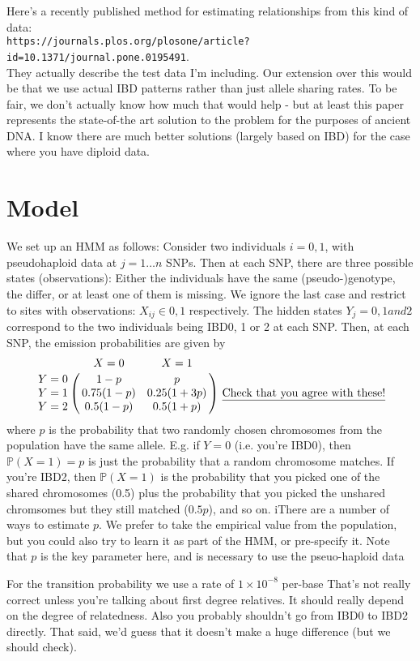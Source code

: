 \documentclass[10pt,a4]{article}
\begin{document}
Here's a recently published method for estimating relationships from this kind of data:\\ \texttt{https://journals.plos.org/plosone/article?id=10.1371/journal.pone.0195491}. \\ They actually describe the test data I'm including. Our extension over this would be that we use actual IBD patterns rather than just allele sharing rates. To be fair, we don't actually know how much that would help - but at least this paper represents the state-of-the art solution to the problem for the purposes of ancient DNA. I know there are much better solutions (largely based on IBD) for the case where you have diploid data. 

\section{Model}

We set up an HMM as follows: Consider two individuals $i=0,1$, with pseudohaploid data at $j=1\dots n$ SNPs. Then at each SNP, there are three possible states (observations): Either the individuals have the same (pseudo-)genotype, the differ, or at least one of them is missing. We ignore the last case and restrict to sites with observations: $X_{ij}\in {0, 1}$ respectively. The hidden states $Y_j=0,1 and 2$ correspond to the two individuals being IBD0, 1 or 2 at each SNP. Then, at each SNP, the emission probabilities are given by
\[
\bordermatrix{
     &X= 0    & X=1      \cr
  Y=0   & 1-p  & p  \cr
  Y=1   & 0.75(1-p)     & 0.25(1+3p)  \cr
   Y=2  & 0.5(1-p) & 0.5(1+p) \cr
} \mbox{    \underline{Check that you agree with these!}}
\]
where $p$ is the probability that two randomly chosen chromosomes from the population have the same allele. E.g. if $Y=0$ (i.e. you're IBD0), then $\mathbb{P}(X=1)=p$ is just the probability that a random chromosome matches. If you're IBD2, then $\mathbb{P}(X=1)$ is the probability that you picked one of the shared chromosomes (0.5) plus the probability that you picked the unshared chromsomes but they still matched ($0.5p$), and so on. iThere are a number of ways to estimate $p$. We prefer to take the empirical value from the population, but you could also try to learn it as part of the HMM, or pre-specify it. Note that $p$ is the key parameter here, and is necessary to use the pseuo-haploid data

For the transition probability we use a rate of $1\times 10^{-8}$ per-base That's not really correct unless you're talking about first degree relatives. It should really depend on the degree of relatedness. Also you probably shouldn't go from IBD0 to IBD2 directly. That said, we'd guess that it doesn't make a huge difference (but we should check).
\end{document}
